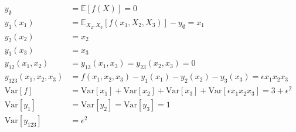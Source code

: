 \begin{align*}
y_\emptyset &= \mathbb{E}[f(X)] = 0 \\
y_1(x_1) &= \mathbb{E}_{X_2, X_3}[f(x_1, X_2, X_3)] - y_\emptyset = x_1 \\
y_2(x_2) &= x_2 \\
y_3(x_3) &= x_3 \\
y_{12}(x_1, x_2) &= y_{13}(x_1, x_3) = y_{23}(x_2, x_3) = 0 \\
y_{123}(x_1, x_2, x_3) &= f(x_1, x_2, x_3) - y_1(x_1) - y_2(x_2) - y_3(x_3) = \epsilon x_1 x_2 x_3 \\
\mathrm{Var}[f] &= \mathrm{Var}[x_1] + \mathrm{Var}[x_2] + \mathrm{Var}[x_3] + \mathrm{Var}[\epsilon x_1 x_2 x_3] = 3 + \epsilon^2 \\
\mathrm{Var}[y_1] &= \mathrm{Var}[y_2] = \mathrm{Var}[y_3] = 1 \\
\mathrm{Var}[y_{123}] &= \epsilon^2
\end{align*}


